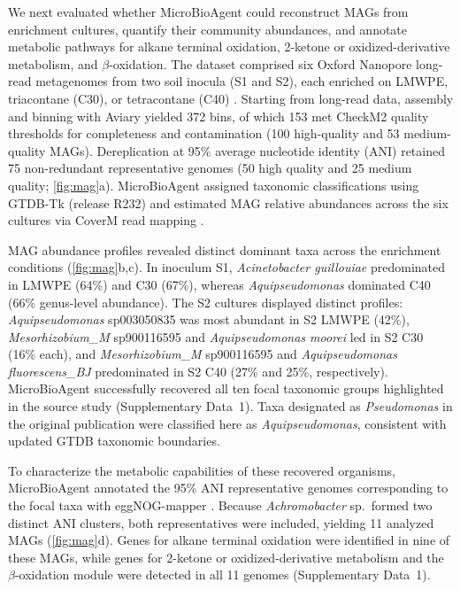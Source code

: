 \documentclass[10pt,letterpaper]{article}
\begin{document}
We next evaluated whether MicroBioAgent could reconstruct MAGs from enrichment
cultures, quantify their community abundances,
and annotate metabolic pathways for alkane terminal oxidation, 2-ketone or 
oxidized-derivative metabolism, and $\beta$-oxidation.
The dataset comprised six Oxford Nanopore long-read metagenomes from two soil
inocula (S1 and S2), each enriched on LMWPE,
triacontane (C30), or tetracontane (C40) \parencite{sandholm2025polyethylene}.
Starting from long-read data, assembly and binning with Aviary yielded 372 bins,
of which 153 met CheckM2 quality thresholds for completeness and contamination (100
high-quality and 53 medium-quality MAGs)\parencite{newell2026aviary,chklovski2023checkm2,bowers2017mimag}.  Dereplication at 95\% average
nucleotide identity (ANI) retained 75 non-redundant representative genomes (50
high quality and 25 medium quality; \cref{fig:mag}a).  MicroBioAgent assigned
taxonomic classifications using GTDB-Tk (release R232) and estimated MAG
relative abundances across the six cultures via CoverM read mapping \parencite{chaumeil2022gtdbtk,aroney2025coverm}.

MAG abundance profiles revealed distinct dominant taxa across the enrichment
conditions (\cref{fig:mag}b,c).  In inoculum S1, \textit{Acinetobacter guillouiae}
predominated in LMWPE (64\%) and C30 (67\%), whereas \textit{Aquipseudomonas}
dominated C40 (66\% genus-level abundance).  The S2 cultures displayed distinct
profiles: \textit{Aquipseudomonas} sp003050835 was most abundant in S2 LMWPE
(42\%), \textit{Mesorhizobium\_M} sp900116595 and \textit{Aquipseudomonas moorei}
led in S2 C30 (16\% each), and \textit{Mesorhizobium\_M} sp900116595 and
\textit{Aquipseudomonas fluorescens\_BJ} predominated in S2 C40 (27\% and 25\%,
respectively).  MicroBioAgent successfully recovered all ten focal taxonomic
groups highlighted in the source study (Supplementary Data~1).  Taxa designated
as \textit{Pseudomonas} in the original publication were classified here as
\textit{Aquipseudomonas}, consistent with updated GTDB taxonomic boundaries.

To characterize the metabolic capabilities of these recovered organisms,
MicroBioAgent annotated the 95\% ANI representative genomes corresponding to
the focal taxa with eggNOG-mapper \parencite{cantalapiedra2021eggnog,huertacepas2019eggnog}.  Because \textit{Achromobacter} sp.\ formed two distinct ANI
clusters, both representatives were included, yielding 11 analyzed MAGs
(\cref{fig:mag}d).  Genes for alkane terminal oxidation were identified in nine
of these MAGs, while genes for 2-ketone or oxidized-derivative metabolism and
the $\beta$-oxidation module were detected in all 11 genomes (Supplementary Data~1).
\end{document}
